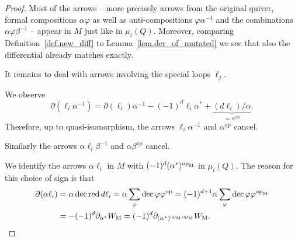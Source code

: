 \documentclass[a4paper,11pt]{amsart}
\theoremstyle{definition}
\DeclareMathOperator{\op}{op}
\DeclareMathOperator{\red}{red}
\DeclareMathOperator{\dec}{dec}
\newcommand{\m}{_{\rm M}}
\numberwithin{theorem}{section}
\begin{document}
\begin{proof}
Most of the arrows -- more precisely arrows from the original quiver, formal compositions $\alpha \varphi$ as well as anti-compositions $\varphi \alpha^{-1}$ and the combinations $\alpha \varphi \beta^{-1}$ -- appear in $M$ just like in $\mu_i(Q)$. Moreover, comparing Definition~\ref{def.new_diff} to Lemma~\ref{lem.der_of_mutated} we see that also the differential already matches exactly.

\medskip
It remains to deal with arrows involving the special loops $\ell_j$.

We observe
\[ \partial( \ell_i \alpha^{-1} ) = \partial(\ell_i) \alpha^{-1} - (-1)^d \ell_i \alpha^* + \underbrace{(d \ell_i) / \alpha}_{= \alpha^{\op}} . \]
Therefore, up to quasi-isomorphism, the arrows $\ell_i \alpha^{-1}$ and $\alpha^{\op}$ cancel.

Similarly the arrows $\alpha \ell_i \beta^{-1}$ and $\alpha \beta^{\op}$ cancel.

We identify the arrows $\alpha \ell_i$ in $M$ with $(-1)^d (\alpha^*)^{\op\m}$ in $\mu_i(Q)$. The reason for this choice of sign is that
\begin{align*}
\partial(\alpha \ell_i) & = \alpha \dec \red d \ell_i = \alpha \sum_{\varphi} \dec \varphi \varphi^{\op} = (-1)^{d+1} \alpha \sum_{\varphi} \dec \varphi \varphi^{\op\m} \\
& = - (-1)^d \partial_{\alpha^*} W\m = (-1)^d \partial_{(\alpha^*)^{\op\m \op\m}} W\m.
\end{align*}


\end{proof}
\end{document}
